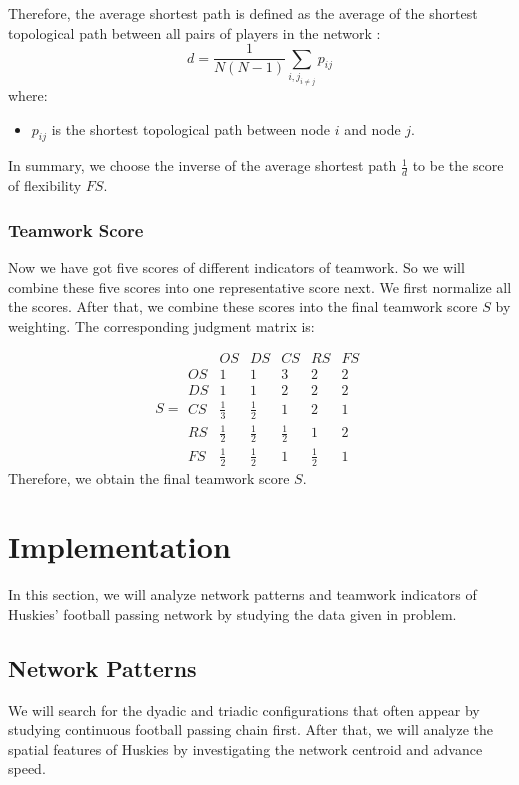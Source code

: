\documentclass{mcmthesis}
\begin{document}
	Therefore, the average shortest path is defined as the average of the shortest topological path between all pairs of players in the network :
	\begin{equation}\label{eq:d}
		d = \frac{1}{N(N-1)} \sum_{i,j_{i \ne j}}p_{ij}
	\end{equation}
	where:
	\begin{itemize}
		\item 	$p_{ij}$ is the shortest topological path between node $i$ and node $j$.
	\end{itemize}

	In summary, we choose the inverse of the average shortest path $\frac{1}{d}$ to be the score of flexibility $FS$.
\subsubsection{Teamwork Score}
	Now we have got five scores of different indicators of teamwork. So we will combine these five scores into one representative score next.  We first normalize all the scores. After that, we combine these scores into the final teamwork score $S$ by weighting. The corresponding judgment matrix is:

	\begin{equation}\label{mat:n}
		S=
 	\begin{matrix}
   		 & OS & DS & CS & RS & FS \\
   		OS & 1 & 1 & 3 & 2 & 2 \\
		DS & 1 & 1 & 2 & 2 & 2\\
		CS & \frac{1}{3} & \frac{1}{2} & 1 & 2 & 1\\ 
		RS & \frac{1}{2} & \frac{1}{2} & \frac{1}{2} & 1 & 2\\ 
		FS & \frac{1}{2} & \frac{1}{2} & 1 & \frac{1}{2} & 1
		
  	\end{matrix} 
	\end{equation}
	Therefore, we obtain the final teamwork score $S$.
\section{Implementation}
	In this section, we will analyze network patterns and teamwork indicators of Huskies' football passing network by studying the data given in problem. 
\subsection{Network Patterns}
	We will search for the dyadic and triadic configurations that often appear by studying continuous football passing chain first.  After that, we will analyze the spatial features of Huskies by investigating the network centroid and advance speed.
\end{document}

